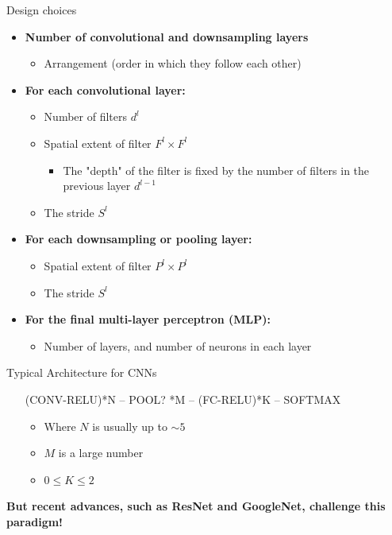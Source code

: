 \documentclass[default, aspectratio=169]{beamer}
\begin{document}
	\begin{frame}{Design choices}
		
		\begin{itemize}
			\item \textbf{Number of convolutional and downsampling layers}
			\begin{itemize}
				\item Arrangement (order in which they follow each other)
			\end{itemize}
			
			\item \textbf{For each convolutional layer:}
			\begin{itemize}
				\item Number of filters $d^l$
				\item Spatial extent of filter $F^l \times F^l$
				\begin{itemize}
					\item The "depth" of the filter is fixed by the number of filters in the previous layer $d^{l-1}$
				\end{itemize}
				\item The stride $S^l$
			\end{itemize}
			
			\item \textbf{For each downsampling or pooling layer:}
			\begin{itemize}
				\item Spatial extent of filter $P^l \times P^l$
				\item The stride $S^l$
			\end{itemize}
			
			\item \textbf{For the final multi-layer perceptron (MLP):}
			\begin{itemize}
				\item Number of layers, and number of neurons in each layer
			\end{itemize}
			
		\end{itemize}
		
	\end{frame}
	
	\begin{frame}{Typical Architecture for CNNs}
		
		\begin{itemize}
			\item [(CONV-RELU)*N – POOL?]*M – (FC-RELU)*K – SOFTMAX
			\begin{itemize}
				\item Where \( N \) is usually up to \( \sim 5 \)
				\item \( M \) is a large number
				\item \( 0 \leq K \leq 2 \)
			\end{itemize}
		\end{itemize}
		
		\bigskip
		
		\textbf{But recent advances, such as ResNet and GoogleNet, challenge this paradigm!}
		
	\end{frame}
	
\end{document}
